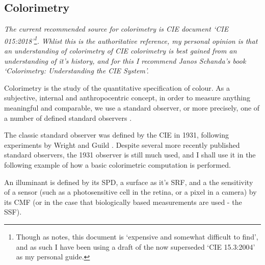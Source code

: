 \subsection{Colorimetry}

\textit{The current recommended source for colorimetry is \gls{CIE} document `\gls{CIE} 015:2018'\citep{cie_cie_2018}\footnote{Though as \citet{fairchild_cie_2019} notes, this document is `expensive and somewhat difficult to find', and as such I have been using a draft of the now superseded `\gls{CIE} 15.3:2004'\citep{cie_cie_2004-2} as my personal guide.}. Whlist this is the authoritative reference, my personal opinion is that an understanding of colorimetry of \gls{CIE} colorimetry is best gained from an understanding of it's history, and for this I recommend Janos Schanda's book `Colorimetry: Understanding the \gls{CIE} System'\citep{schanda_colorimetry_2007}.}

\bigskip

Colorimetry is the study of the quantitative specification of colour. As a subjective, internal and anthropocentric concept, in order to measure anything meaningful and comparable, we use a standard observer, or more precisely, one of a number of defined standard observers \cite{cie_bs_2011}.

The classic standard observer was defined by the \gls{CIE} in 1931, following experiments by Wright and Guild \cite{wright_re-determination_1929, guild_colorimetric_1931}. Despite several more recently published standard observers, the 1931 observer is still much used, and I shall use it in the following example of how a basic colorimetric computation is performed.


An illuminant is defined by its \gls{SPD}, a surface as it's \gls{SRF}, and a the sensitivity of a sensor (such as a photosensitive cell in the retina, or a pixel in a camera) by its \gls{CMF} (or in the case that biologically based measurements are used - the \gls{SSF}).

